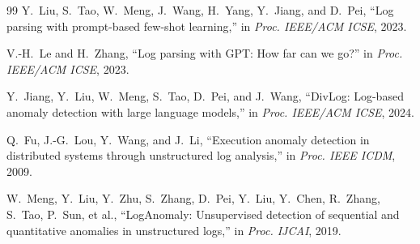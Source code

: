 \documentclass[11pt]{article}
\begin{document}
\begin{thebibliography}{99}
Y.~Liu, S.~Tao, W.~Meng, J.~Wang, H.~Yang, Y.~Jiang, and D.~Pei,
``Log parsing with prompt-based few-shot learning,''
in \emph{Proc. IEEE/ACM ICSE}, 2023.

V.-H.~Le and H.~Zhang,
``Log parsing with GPT: How far can we go?''
in \emph{Proc. IEEE/ACM ICSE}, 2023.

Y.~Jiang, Y.~Liu, W.~Meng, S.~Tao, D.~Pei, and J.~Wang,
``DivLog: Log-based anomaly detection with large language models,''
in \emph{Proc. IEEE/ACM ICSE}, 2024.

Q.~Fu, J.-G.~Lou, Y.~Wang, and J.~Li,
``Execution anomaly detection in distributed systems through unstructured log analysis,''
in \emph{Proc. IEEE ICDM}, 2009.

W.~Meng, Y.~Liu, Y.~Zhu, S.~Zhang, D.~Pei, Y.~Liu, Y.~Chen, R.~Zhang, S.~Tao, P.~Sun, et al.,
``LogAnomaly: Unsupervised detection of sequential and quantitative anomalies in unstructured logs,''
in \emph{Proc. IJCAI}, 2019.

\end{thebibliography}
\end{document}
